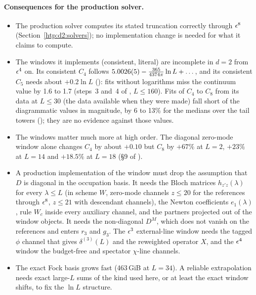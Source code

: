 \paragraph{Consequences for the production solver.}
\begin{itemize}
\item The production solver computes its stated truncation correctly through $\epsilon^8$ (Section~\ref{htp:d2:solvers}); no
 implementation change is needed for what it claims to compute.
\item The windows it implements (consistent, literal) are incomplete in $d=2$ from $\epsilon^4$ on. Its consistent $C_4$ follows
 $5.0026(5)-\frac{365}{4374\pi}\ln L+\dots$, and its consistent $C_5$ needs about $+0.2\ln L$
 (): fits without logarithms miss the continuum value by 1.6 to 1.7 (steps~3
 and~4 of , $L\le160$). Fits of $C_4$ to $C_8$ from its data at $L\le30$ (the data available when they were made) fall short of the diagrammatic
 values in magnitude, by 6 to 13\% for the medians over the tail towers (); they are no
 evidence against those values.
\item The windows matter much more at high order. The diagonal zero-mode window alone changes $C_4$ by about $+0.10$ but $C_8$ by
 $+67\%$ at $L=2$, $+23\%$ at $L=14$ and $+18.5\%$ at $L=18$ (\S9 of ).
\item A production implementation of the window must drop the assumption that $D$ is diagonal in the occupation basis.
 It needs the Bloch matrices $h_{z'z}(\lambda)$ for every $\lambda\le L$ (in scheme $W$, zero-mode channels $z\le20$ for the references
 through $\epsilon^8$, $z\le21$ with descendant channels), the Newton coefficients $e_1(\lambda)$, rule $W_c$ inside every
 auxiliary channel, and the partners projected out of the window objects. It needs the non-diagonal $D^M$, which does not
 vanish on the references and enters $r_3$ and $g_3$. The $\epsilon^3$ external-line window needs the tagged $\phi$ channel that
 gives $\delta^{(3)}(L)$ and the reweighted operator $X$, and the $\epsilon^4$ window the budget-free and spectator $\chi$-line
 channels.
\item The exact Fock basis grows fast (463\,GiB at $L=34$). A reliable extrapolation needs exact large-$L$ sums of the kind
 used here, or at least the exact window shifts, to fix the $\ln L$ structure.
\end{itemize}
